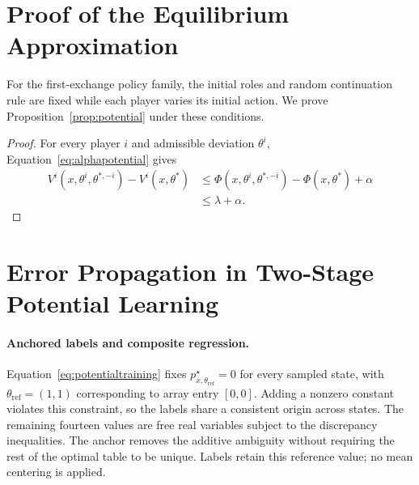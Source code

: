 \documentclass[pmlr]{jmlr}
\begin{document}
\clearpage
\appendix
\section{Proof of the Equilibrium Approximation}
\label{app:potentialproof}
For the first-exchange policy family, the initial roles and random continuation rule are fixed while each player varies its initial action. We prove Proposition~\ref{prop:potential} under these conditions.
\begin{proof}
For every player $i$ and admissible deviation $\theta^i$, Equation~\eqref{eq:alphapotential} gives
\begin{align*}
 V^i(x,\theta^i,\theta^{*,-i})-V^i(x,\theta^*)
 &\leq\Phi(x,\theta^i,\theta^{*,-i})-\Phi(x,\theta^*)+\alpha\\
 &\leq\lambda+\alpha.
\end{align*}
\end{proof}



\section{Error Propagation in Two-Stage Potential Learning}
\label{app:potentialerrors}
\paragraph{Anchored labels and composite regression.}
Equation~\eqref{eq:potentialtraining} fixes $p_{x,\theta_{\mathrm{ref}}}^\star=0$ for every sampled state, with $\theta_{\mathrm{ref}}=(1,1)$ corresponding to array entry $[0,0]$. Adding a nonzero constant violates this constraint, so the labels share a consistent origin across states. The remaining fourteen values are free real variables subject to the discrepancy inequalities. The anchor removes the additive ambiguity without requiring the rest of the optimal table to be unique. Labels retain this reference value; no mean centering is applied.
\end{document}
